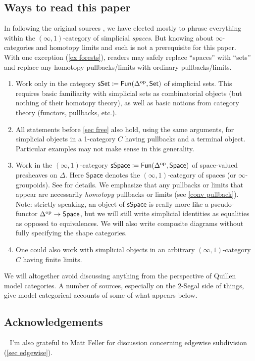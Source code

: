 \documentclass{amsart}
\theoremstyle{definition}
\theoremstyle{remark}
\newcommand{\set}{\mathsf{Set}}
\newcommand{\spaces}{\mathsf{Space}}
\newcommand{\sset}{\mathsf{sSet}}
\newcommand{\sspace}{\mathsf{sSpace}}
\newcommand{\fun}{\mathsf{Fun}}
\newcommand{\op}{\textup{op}}
\newcommand{\phnote}[1]{\todo[color=purple!40,linecolor=purple!40!black,size=\tiny]{#1}}
\newcommand{\phnoteil}[1]{\ \todo[inline,color=purple!40,linecolor=purple!40!black,size=\normalsize]{#1}}
\begin{document}
\subsection{Ways to read this paper}\label{sec ways to read}
In following the original sources \cite{GKT1,GKT2,GKT3}, we have elected mostly to phrase everything within the $(\infty,1)$-category of simplicial \emph{spaces}.
But knowing about $\infty$-categories and homotopy limits and such is not a prerequisite for this paper.
With one exception (\cref{ex forests}), readers may safely replace ``spaces'' with ``sets'' and replace any homotopy pullbacks/limits with ordinary pullbacks/limits.
\begin{enumerate}[left=0pt]
\item Work only in the category $\sset \coloneqq \fun(\Delta^\op, \set)$ of simplicial sets. This requires basic familiarity with simplicial sets as combinatorial objects (but nothing of their homotopy theory), as well as basic notions from category theory (functors, pullbacks, etc.).
\item All statements before \cref{sec free} also hold, using the same arguments, for simplicial objects in a 1-category $C$ having pullbacks and a terminal object. 
Particular examples may not make sense in this generality.
\item Work in the $(\infty,1)$-category $\sspace \coloneqq \fun(\Delta^\op, \spaces)$ of space-valued presheaves on $\Delta$.
Here $\spaces$ denotes the $(\infty,1)$-category of spaces (or $\infty$-groupoids).
See \cite{GKT1} for details.
We emphasize that any pullbacks or limits that appear are necessarily \emph{homotopy} pullbacks or limits (see \cref{conv pullback}).
Note: strictly speaking, an object of $\sspace$ is really more like a pseudo-functor $\Delta^\op \to \spaces$, but we will still write simplicial identities as equalities as opposed to equivalences.
We will also write composite diagrams without fully specifying the shape categories.
\item 
One could also work with simplicial objects in an arbitrary $(\infty,1)$-category $C$ having finite limits.
\end{enumerate}
We will altogether avoid discussing anything from the perspective of Quillen model categories.
A number of sources, especially on the 2-Segal side of things, give model categorical accounts of some of what appears below.\phnote{Cite a few such sources.}

\subsection*{Acknowledgements}
\phnoteil{Organizers, BIRS, etc.}
I'm also grateful to Matt Feller for discussion concerning edgewise subdivision (\cref{sec edgewise}).
\end{document}
